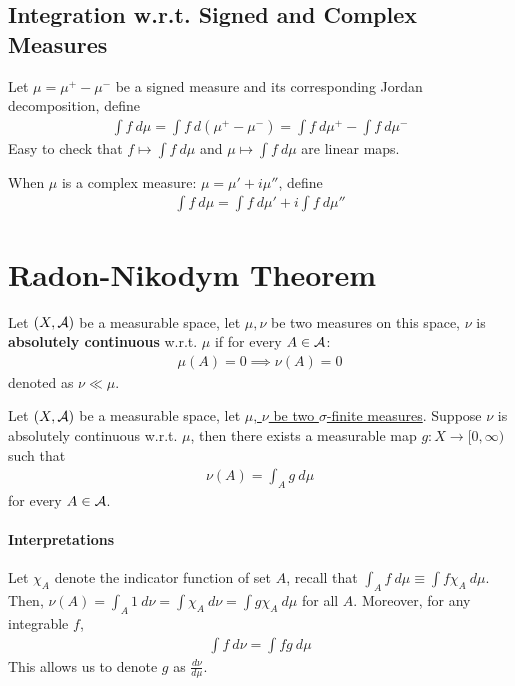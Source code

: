 \documentclass[11pt]{article}
\newcommand{\dmu}[0]{\ d\mu}
\begin{document}
	
	\subsection{Integration w.r.t. Signed and Complex Measures}
	\begin{definition}
		Let $\mu = \mu^+ - \mu^-$ be a signed measure and its corresponding Jordan decomposition, define
		\begin{align}
			\int f\dmu = \int f\ d(\mu^+ - \mu^-) = \int f\dmu^+ - \int f\dmu^-
		\end{align}
		Easy to check that $f \mapsto \int f\dmu$ and $\mu \mapsto \int f\dmu$ are linear maps.
		
		When $\mu$ is a complex measure: $\mu = \mu' + i \mu''$, define
		\begin{align}
			\int f\dmu = \int f\dmu' + i \int f\dmu''
		\end{align}
	\end{definition}

	\section{Radon-Nikodym Theorem}
	
	\begin{definition}
		Let $(X, \mathcal{{A}})$ be a measurable space, let $\mu, \nu$ be two measures on this space, $\nu$ is \textbf{absolutely continuous} w.r.t. $\mu$ if for every $A \in \mathcal{{A}}$:
		\begin{align}
			\mu(A) = 0 \implies \nu(A) = 0
		\end{align}
		denoted as $\nu \ll \mu$.
	\end{definition}

	\begin{theorem}
		Let $(X, \mathcal{{A}})$ be a measurable space, let \ul{$\mu$, $\nu$ be two $\sigma$-finite measures}. Suppose $\nu$ is absolutely continuous w.r.t. $\mu$, then there exists a measurable map $g: X \to [0, \infty)$ such that
		\begin{align}
			\nu(A) = \int_A g\dmu
		\end{align}
		for every $A \in \mathcal{{A}}$.
	\end{theorem}
	\paragraph{Interpretations} Let $\chi_A$ denote the indicator function of set $A$, recall that $\int_A f\dmu \equiv \int f\chi_A\dmu$. Then, $\nu(A) = \int_A 1\ d\nu = \int \chi_A\ d\nu = \int g \chi_A\dmu$ for all $A$. Moreover, for any integrable $f$,
	\begin{align}
		\int f\ d\nu = \int fg\dmu
	\end{align}
	This allows us to denote $g$ as $\frac{d\nu}{d\mu}$.
	
\end{document}
